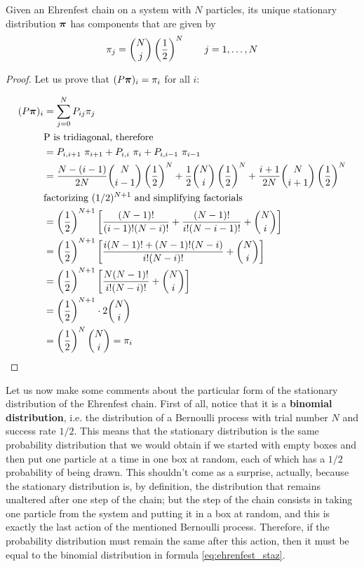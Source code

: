 \begin{theorem}
    Given an Ehrenfest chain on a system with $N$ particles, its unique stationary distribution $\boldsymbol{\pi}$ has components that are given by
    \begin{equation} \label{eq:ehrenfest_staz}
        \pi_j = {{N} \choose {j}} \left(\frac{1}{2} \right)^{N} \quad \quad j = 1,\dots, N
    \end{equation}
\end{theorem}
\begin{proof}
    Let us prove that $(P \boldsymbol{\pi})_i =\pi_i$ for all $i$:

        \begin{align}
            (P \boldsymbol{\pi})_i 
            & =  \sum_{j = 0}^N P_{ij} \pi_j \\
            & \text{P is tridiagonal, therefore} \\ 
            & = P_{i,i+1}~\pi_{i+1} + P_{i,i}~\pi_i + P_{i,i-1}~\pi_{i-1}\\
            & = \frac{N-(i-1)}{2N} {{N} \choose {i-1}} \left(\frac{1}{2} \right)^{N} + \frac{1}{2} {{N} \choose {i}} \left(\frac{1}{2} \right)^{N} + \frac{i+1}{2N} {{N} \choose {i+1}} \left(\frac{1}{2} \right)^{N} \\
            & \text{factorizing $(1/2)^{N+1}$ and simplifying factorials} \\
            & = \left(\frac{1}{2} \right)^{N+1} \left[ \frac{(N-1)!}{(i-1)! (N-i)!} + \frac{(N-1)!}{i! (N-i-1)!} + {{N} \choose {i}} \right]\\
            & = \left(\frac{1}{2} \right)^{N+1} \left[ \frac{i (N-1)! + (N-1)! (N-i)}{i! (N-i)!} + {{N} \choose {i}} \right] \\
            & = \left(\frac{1}{2} \right)^{N+1} \left[ \frac{N (N-1)!}{i! (N-i)!} + {{N} \choose {i}} \right] \\
            & = \left(\frac{1}{2} \right)^{N+1} \cdot 2 {{N} \choose {i}}\\
            & = \left(\frac{1}{2} \right)^{N} {{N} \choose {i}} = \pi_i 
        \end{align}
\end{proof}


Let us now make some comments about the particular form of the stationary distribution of the Ehrenfest chain. First of all, notice that it is a \textbf{binomial distribution}, i.e. the distribution of a Bernoulli process with trial number $N$ and success rate $1/2$. This means that the stationary distribution is the same probability distribution that we would obtain if we started with empty boxes and then put one particle at a time in one box at random, each of which has a $1/2$ probability of being drawn. This shouldn't come as a surprise, actually, because the stationary distribution is, by definition, the distribution that remains unaltered after one step of the chain; but the step of the chain consists in taking one particle from the system and putting it in a box at random, and this is exactly the last action of the mentioned Bernoulli process. Therefore, if the probability distribution must remain the same after this action, then it must be equal to the binomial distribution in formula \ref{eq:ehrenfest_staz}.

